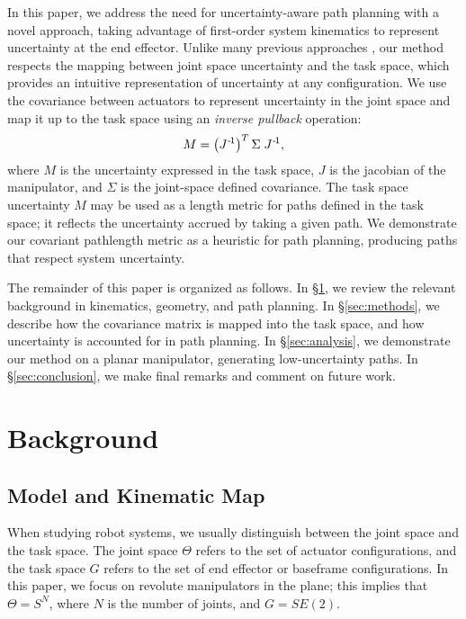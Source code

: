 \documentclass[10pt,conference]{ieeeconf}
\begin{document}
In this paper, we address the need for uncertainty-aware path planning with a novel approach, taking advantage of first-order system kinematics to represent uncertainty at the end effector.
Unlike many previous approaches \cite{previous work?}, our method respects the mapping between joint space uncertainty and the task space, which provides an intuitive representation of uncertainty at any configuration.
We use the covariance between actuators to represent uncertainty in the joint space and map it up to the task space using an \textit{inverse pullback} operation:
\begin{equation}
	M = \left(J^{\hspace{.1ex}\text{-}\hspace{-.2ex}1}\right)^T \Sigma \; J^{\hspace{.1ex}\text{-}\hspace{-.2ex}1},
\end{equation}
where $M$ is the uncertainty expressed in the task space, $J$ is the jacobian of the manipulator, and $\Sigma$ is the joint-space defined covariance.
The task space uncertainty $M$ may be used as a length metric for paths defined in the task space; it reflects the uncertainty accrued by taking a given path.
We demonstrate our covariant pathlength metric as a heuristic for path planning, producing paths that respect system uncertainty.

The remainder of this paper is organized as follows.
In \S\ref{sec:background}, we review the relevant background in kinematics, geometry, and path planning.
In \S\ref{sec:methods}, we describe how the covariance matrix is mapped into the task space, and how uncertainty is accounted for in path planning.
In \S\ref{sec:analysis}, we demonstrate our method on a planar manipulator, generating low-uncertainty paths.
In \S\ref{sec:conclusion}, we make final remarks and comment on future work.

\section{Background}\label{sec:background}
\subsection{Model and Kinematic Map}
When studying robot systems, we usually distinguish between the joint space and the task space.
The joint space $\Theta$ refers to the set of actuator configurations, and the task space $G$ refers to the set of end effector or baseframe configurations.
In this paper, we focus on revolute manipulators in the plane; this implies that $\Theta = S^N$, where $N$ is the number of joints, and $G = SE(2)$.
\end{document}
